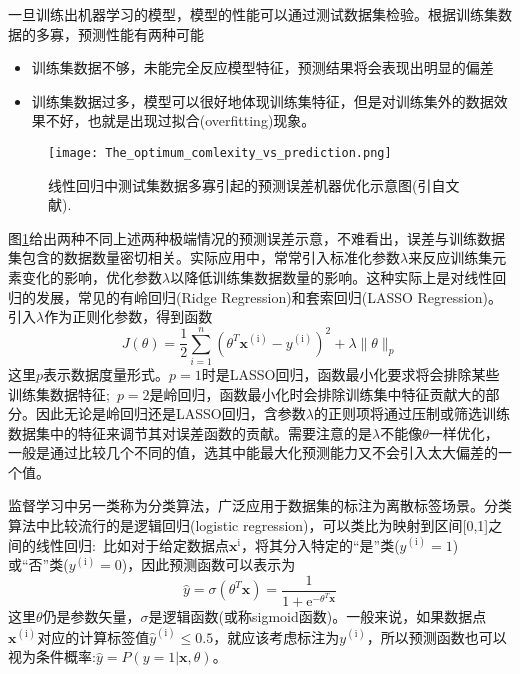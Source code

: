 \documentclass[10pt, oneside, a4paper]{article}      %
\begin{document}
一旦训练出机器学习的模型，模型的性能可以通过测试数据集检验。根据训练集数据的多寡，预测性能有两种可能
\begin{itemize}
	\item 训练集数据不够，未能完全反应模型特征，预测结果将会表现出明显的偏差
	\item 训练集数据过多，模型可以很好地体现训练集特征，但是对训练集外的数据效果不好，也就是出现过拟合\textrm{(overfitting)}现象。
\end{itemize}
\begin{figure}[h!]
\centering
\vspace*{-0.1in}
\texttt{[image: The\_optimum\_comlexity\_vs\_prediction.png]}
\caption{\textrm{线性回归中测试集数据多寡引起的预测误差机器优化示意图(引自文献\cite{Brunet_Thesis_2010}).}}%
\label{ML_Fitting_Error}
\end{figure}
图\ref{ML_Fitting_Error}给出两种不同上述两种极端情况的预测误差示意，不难看出，误差与训练数据集包含的数据数量密切相关。实际应用中，常常引入标准化参数$\lambda$来反应训练集元素变化的影响，优化参数$\lambda$以降低训练集数据数量的影响。这种实际上是对线性回归的发展，常见的有岭回归\textrm{(Ridge Regression)}和套索回归\textrm{(LASSO Regression)}。引入$\lambda$作为正则化参数，得到函数
\begin{equation}
	J(\theta)=\dfrac12\sum_{i=1}^n(\theta^T\mathbf{x}^{(\mathrm{i})}-y^{(\mathrm{i})})^2+\lambda\|\theta\|_p
	\label{eq:Ridge_LASSO}
\end{equation}
这里$p$表示数据度量形式。$p=1$时是\textrm{LASSO}回归，函数最小化要求将会排除某些训练集数据特征;~$p=2$是岭回归，函数最小化时会排除训练集中特征贡献大的部分。因此无论是岭回归还是\textrm{LASSO}回归，含参数$\lambda$的正则项将通过压制或筛选训练数据集中的特征来调节其对误差函数的贡献。需要注意的是$\lambda$不能像$\theta$一样优化，一般是通过比较几个不同的值，选其中能最大化预测能力又不会引入太大偏差的一个值。

监督学习中另一类称为分类算法，广泛应用于数据集的标注为离散标签场景。分类算法中比较流行的是逻辑回归\textrm{(logistic regression)}，可以类比为映射到区间[0,1]之间的线性回归:~比如对于给定数据点$\mathbf{x}^{\mathrm{i}}$，将其分入特定的“是”类($y^{\mathrm{(i)}}=1$)或“否”类($y^{\mathrm{(i)}}=0$)，因此预测函数可以表示为
\begin{equation}
	\hat y=\sigma(\theta^T\mathbf{x})=\dfrac1{1+\mathrm{e}^{-\theta^T\mathbf{x}}}
	\label{eq:logstical_y}
\end{equation}
这里$\theta$仍是参数矢量，$\sigma$是逻辑函数(或称\textrm{sigmoid}函数)。一般来说，如果数据点$\mathbf{x}^{(\mathrm{i})}$对应的计算标签值$\hat{y}^{(\mathrm{i})}\leqslant0.5$，就应该考虑标注为$y^{(\mathrm{i})}$，所以预测函数也可以视为条件概率:$\hat{y}=P(y=1|\mathbf{x},\theta)$。
\end{document}
